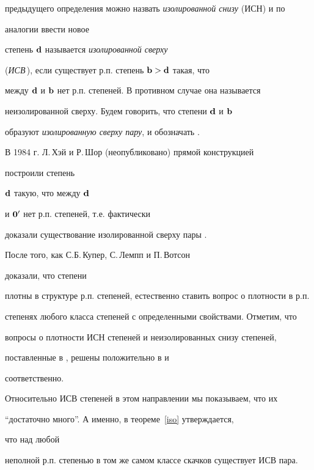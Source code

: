 предыдущего определения можно назвать {\it изолированной снизу} (ИСН) и по 


аналогии ввести новое





\begin{defnnonum}


\pp степень ${\bold d}$ называется {\em изолированной сверху}


({\em ИСВ\,}), если существует р.п. степень ${\bold b}>{\bold d}$ такая, что


между ${\bold d}$ и ${\bold b}$ нет р.п. степеней. В противном случае она называется


неизолированной сверху. Будем говорить, что степени ${\bold d}$ и ${\bold b}$


образуют {\em изолированную сверху пару}, и обозначать .


\end{defnnonum}





В 1984 г. Л.\,Хэй и Р.\,Шор (неопубликовано) прямой конструкцией 


построили \pp степень 


${\bold d}$ такую, что между ${\bold d}$


и ${\bold 0^\prime}$ нет р.п. степеней, т.е. фактически


доказали существование изолированной сверху пары .


После того, как С.Б.\,Купер, С.\,Лемпп и П.\,Вотсон \cite{CLW}


доказали, что \pp степени 


плотны в структуре р.п. степеней, естественно ставить вопрос о плотности в р.п.


степенях любого класса \pp степеней с определенными свойствами. Отметим, что


вопросы о плотности ИСН \pp степеней и неизолированных снизу \pp степеней, 


поставленные в \cite{CoYi}, решены положительно в \cite{LF} и


\cite{ALS} соответственно.


Относительно ИСВ \pp степеней в этом направлении мы показываем, что их


``достаточно много''. А именно, в теореме~\ref{iso} утверждается,


что над любой 


неполной р.п. степенью в том же самом классе скачков существует ИСВ пара. 



